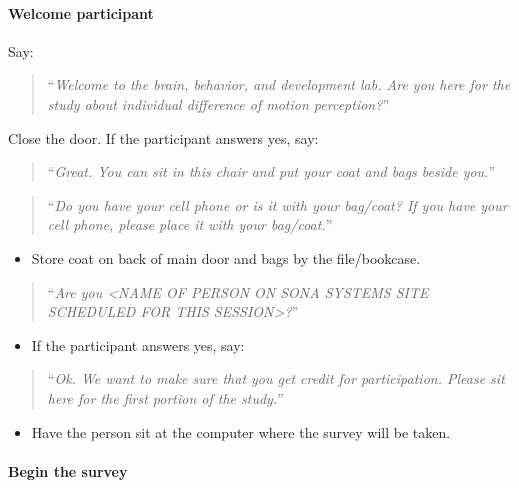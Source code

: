 \documentclass[]{article}
\providecommand{\tightlist}{%
  \setlength{\itemsep}{0pt}\setlength{\parskip}{0pt}}
\let\oldparagraph\paragraph
\renewcommand{\paragraph}[1]{\oldparagraph{#1}\mbox{}}
\begin{document}
\paragraph{Welcome participant}\label{welcome-participant}

Say:

\begin{quote}
``\emph{Welcome to the brain, behavior, and development lab. Are you
here for the study about individual difference of motion perception?}''
\end{quote}

Close the door. If the participant answers yes, say:

\begin{quote}
``\emph{Great. You can sit in this chair and put your coat and bags
beside you.}''
\end{quote}

\begin{quote}
``\emph{Do you have your cell phone or is it with your bag/coat? If you
have your cell phone, please place it with your bag/coat.}''
\end{quote}

\begin{itemize}
\tightlist
\item
  Store coat on back of main door and bags by the file/bookcase.
\end{itemize}

\begin{quote}
``\emph{Are you \textless{}NAME OF PERSON ON SONA SYSTEMS SITE SCHEDULED
FOR THIS SESSION\textgreater{}?}''
\end{quote}

\begin{itemize}
\tightlist
\item
  If the participant answers yes, say:
\end{itemize}

\begin{quote}
``\emph{Ok. We want to make sure that you get credit for participation.
Please sit here for the first portion of the study.}''
\end{quote}

\begin{itemize}
\tightlist
\item
  Have the person sit at the computer where the survey will be taken.
\end{itemize}

\paragraph{Begin the survey}\label{begin-the-survey}
\end{document}

